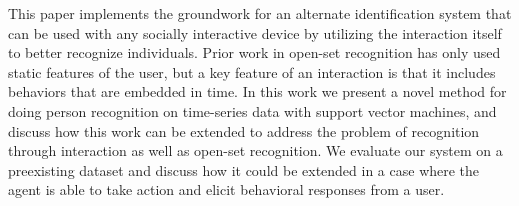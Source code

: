 \documentclass[conference]{IEEEtran}
\newcommand{\elaine}[1]{{\textcolor[rgb]{0.1,0.4,0.6}{[ESS: {\it #1}]}}}
\begin{document}
This paper implements the groundwork for an alternate identification system that can be used with any socially interactive device by utilizing the interaction itself to better recognize individuals. Prior work in open-set recognition has only used static features of the user, but a key feature of an interaction is that it includes behaviors that are embedded in time. In this work we present a novel method for doing person recognition on time-series data with support vector machines, and discuss how this work can be extended to address the problem of recognition through interaction as well as open-set recognition. We evaluate our system on a preexisting dataset and discuss how it could be extended in a case where the agent is able to take action and elicit behavioral responses from a user. 








\end{document}
